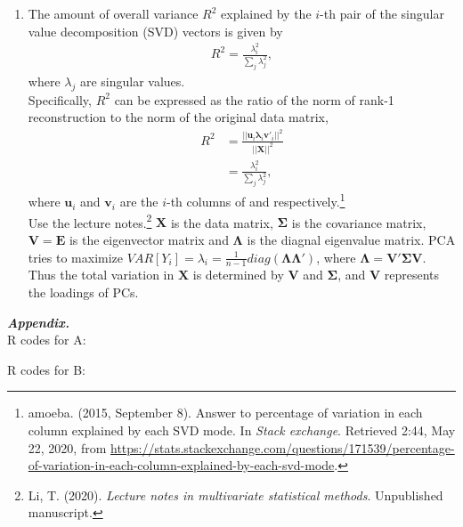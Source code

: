 \documentclass[10pt]{article}
\begin{document}
\begin{enumerate}[1)]
\item
The amount of overall variance $R^2$ explained by the $i$-th pair of the singular value decomposition (SVD) vectors is given by
\begin{align*}
R^2=\frac{\lambda_i^2}{\sum_j\lambda_j^2},
\end{align*}
where $\lambda_j$ are singular values.\\
Specifically, $R^2$ can be expressed as the ratio of the norm of rank-1 reconstruction to the norm of the original data matrix,\\
\begin{align*}
R^2&=\frac{||\pmb{u}_i\pmb{\lambda}_i\pmb{v}'_i||^2}{||\pmb{X}||^2}\\
&=\frac{\lambda_i^2}{\sum_j\lambda_j^2},
\end{align*}
where $\pmb{u}_i$ and $\pmb{v}_i$ are the $i$-th columns of  and  respectively.\footnote{\;amoeba. (2015, September 8). Answer to percentage of variation in each column explained by each SVD mode. In \textit{Stack exchange}. Retrieved 2:44, May 22, 2020, from \url{https://stats.stackexchange.com/questions/171539/percentage-of-variation-in-each-column-explained-by-each-svd-mode}.}\\
Use the lecture notes.\footnote{\;Li, T. (2020). \textit{Lecture notes in multivariate statistical methods}. Unpublished manuscript.} $\pmb{X}$ is the data matrix, $\pmb{\Sigma}$ is the covariance matrix, $\pmb{V}=\pmb{E}$ is the eigenvector matrix and $\pmb{\Lambda}$ is the diagnal eigenvalue matrix. PCA tries to maximize $VAR[Y_i]=\lambda_i=\frac{1}{n-1}diag(\pmb{\Lambda}\pmb{\Lambda}')$, where $\pmb{\Lambda}=\pmb{V}'\pmb{\Sigma}\pmb{V}$. Thus the total variation in $\pmb{X}$ is determined by $\pmb{V}$ and $\pmb{\Sigma}$, and $\pmb{V}$ represents the loadings of PCs.

\end{enumerate}

\newpage

\textbf{\textit{Appendix.}}\\

R codes for A:
\vspace{3mm}

\vspace{3mm}

R codes for B:
\vspace{3mm}

\end{document}

